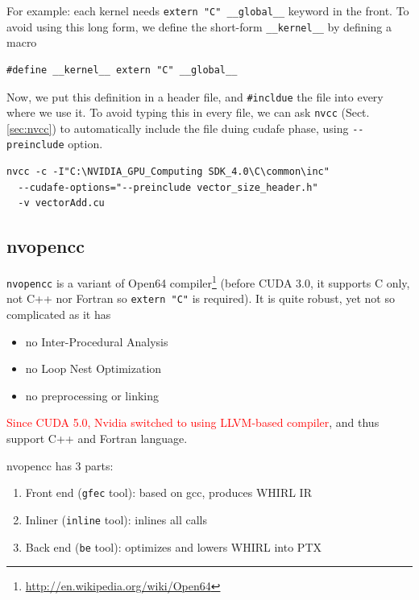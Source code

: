 For example: each kernel needs \verb!extern "C" __global__! keyword in the front.
To avoid using this long form, we define the short-form \verb!__kernel__! by
defining a macro

\begin{verbatim}
#define __kernel__ extern "C" __global__
\end{verbatim}

Now, we put this definition in a header file, and \verb!#incldue! the file into
every where we use it. To avoid typing this in every file, we can ask
\verb!nvcc! (Sect.\ref{sec:nvcc}) to automatically include the file duing cudafe
phase, using \verb!--preinclude! option.
\begin{verbatim}
nvcc -c -I"C:\NVIDIA_GPU_Computing SDK_4.0\C\common\inc"
  --cudafe-options="--preinclude vector_size_header.h" 
  -v vectorAdd.cu
\end{verbatim}


\subsection{nvopencc}
\label{sec:nvopencc}

\verb!nvopencc! is a variant of Open64 compiler\footnote{\url{http://en.wikipedia.org/wiki/Open64}}
(before CUDA 3.0, it supports C
only, not C++ nor Fortran so \verb!extern "C"! is required). It is quite robust,
yet not so complicated as it has
\begin{itemize}
\item no Inter-Procedural Analysis
\item no Loop Nest Optimization
\item no preprocessing or linking
\end{itemize}
\textcolor{red}{Since CUDA 5.0, Nvidia switched to
using LLVM-based compiler}, and thus support C++ and Fortran language.

nvopencc has 3 parts:
\begin{enumerate}
\item Front end (\verb!gfec! tool): based on gcc, produces WHIRL IR
\item Inliner (\verb!inline! tool): inlines all calls
\item Back end (\verb!be! tool): optimizes and lowers WHIRL into PTX
\end{enumerate}

